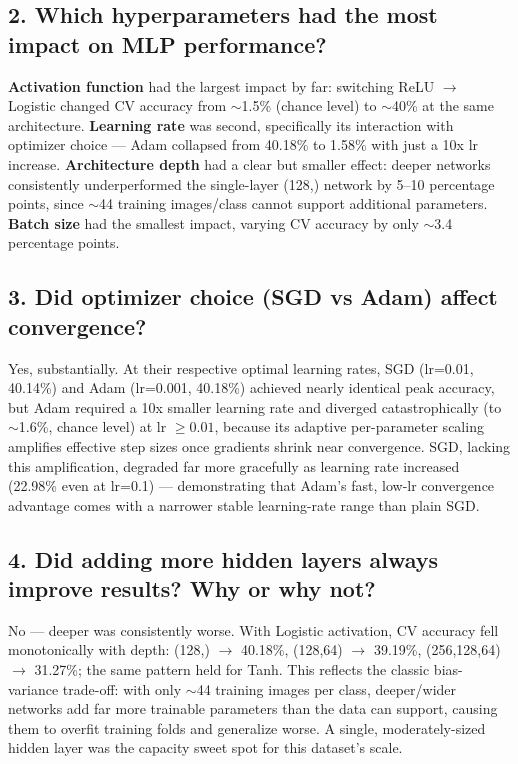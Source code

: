 \documentclass[12pt,a4paper]{article}
\begin{document}
\subsection{2. Which hyperparameters had the most impact on MLP performance?}
\textbf{Activation function} had the largest impact by far: switching ReLU $\to$ Logistic changed CV accuracy from $\sim$1.5\% (chance level) to $\sim$40\% at the same architecture. \textbf{Learning rate} was second, specifically its interaction with optimizer choice — Adam collapsed from 40.18\% to 1.58\% with just a 10x lr increase. \textbf{Architecture depth} had a clear but smaller effect: deeper networks consistently underperformed the single-layer (128,) network by 5--10 percentage points, since $\sim$44 training images/class cannot support additional parameters. \textbf{Batch size} had the smallest impact, varying CV accuracy by only $\sim$3.4 percentage points.

\subsection{3. Did optimizer choice (SGD vs Adam) affect convergence?}
Yes, substantially. At their respective optimal learning rates, SGD (lr=0.01, 40.14\%) and Adam (lr=0.001, 40.18\%) achieved nearly identical peak accuracy, but Adam required a 10x smaller learning rate and diverged catastrophically (to $\sim$1.6\%, chance level) at lr $\ge 0.01$, because its adaptive per-parameter scaling amplifies effective step sizes once gradients shrink near convergence. SGD, lacking this amplification, degraded far more gracefully as learning rate increased (22.98\% even at lr=0.1) — demonstrating that Adam's fast, low-lr convergence advantage comes with a narrower stable learning-rate range than plain SGD.

\subsection{4. Did adding more hidden layers always improve results? Why or why not?}
No — deeper was consistently worse. With Logistic activation, CV accuracy fell monotonically with depth: (128,) $\to$ 40.18\%, (128,64) $\to$ 39.19\%, (256,128,64) $\to$ 31.27\%; the same pattern held for Tanh. This reflects the classic bias-variance trade-off: with only $\sim$44 training images per class, deeper/wider networks add far more trainable parameters than the data can support, causing them to overfit training folds and generalize worse. A single, moderately-sized hidden layer was the capacity sweet spot for this dataset's scale.
\end{document}
